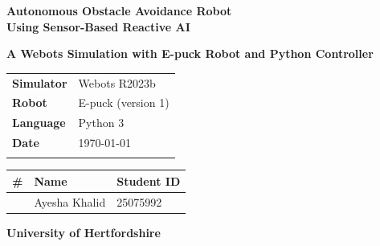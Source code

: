 \documentclass[12pt, a4paper]{article}
\begin{document}
\begin{titlepage}
    \centering

    \vspace{2cm}

    \textbf{\Huge\color{nustblue} Autonomous Obstacle Avoidance Robot}\\[0.5cm]
    \textbf{\Huge\color{nustblue} Using Sensor-Based Reactive AI}\\
    \vspace{1.5cm}

    \textbf{\Large\color{accent} A Webots Simulation with E-puck Robot and Python Controller}\\
    \vspace{3cm}

    \centering
    \begin{tabular}{@{}p{4cm}p{8cm}@{}}
    \toprule
    \textbf{Simulator} & Webots R2023b \\
    \addlinespace
    \textbf{Robot} & E-puck (version 1) \\
    \addlinespace
    \textbf{Language} & Python 3 \\
    \addlinespace
    \textbf{Date} & \today \\
    \addlinespace
    \bottomrule
    \end{tabular}
    \vspace{2cm}

    \renewcommand{\arraystretch}{1.4}
    \begin{tabular}{>{\centering\arraybackslash}p{1cm} l l}
    \toprule
    \textbf{\#} & \textbf{Name} & \textbf{Student ID} \\
    \midrule
    1 & Ayesha Khalid & 25075992 \\
    \bottomrule
    \end{tabular}
    \renewcommand{\arraystretch}{1.0}

    \vfill

    \large\textbf{University of Hertfordshire}\\
    \vspace{1cm}

\end{titlepage}

\tableofcontents

\vspace{1cm}

\listoffigures
\newpage
\end{document}
